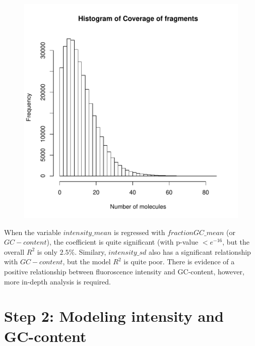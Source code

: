 \documentclass[11pt]{article}
\begin{document}
\begin{figure}[th]
\centering 
\includegraphics{GCvsIntensity_Report2-003}
\label{fig:Fig1}
\end{figure}

When the variable $intensity\_mean$ is regressed with $fractionGC\_mean$ (or $GC-content$), the coefficient is quite significant (with p-value $<e^{-16}$, but the overall $R^2$ is only $2.5\%$. Similary, $intensity\_sd$ also has a significant relationship with $GC-content$, but the model $R^2$ is quite poor. There is evidence of a positive relationship between fluoroscence intensity and GC-content, however, more in-depth analysis is required. 

\section{Step 2: Modeling intensity and GC-content}
\end{document}
